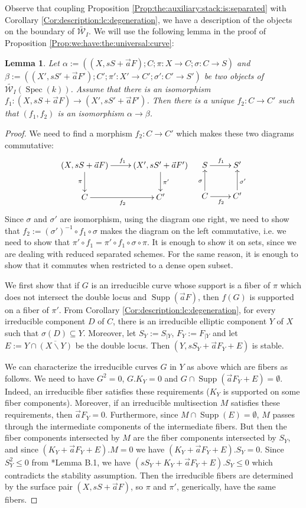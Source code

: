 \documentclass[11pt]{amsart}
\newcommand{\cE}{\mathcal{W}}
\newcommand{\spec}{\operatorname{Spec}}
\newcommand{\supp}{\operatorname{Supp}}
\newtheorem{Lemma}[theorem]{Lemma}
\theoremstyle{definition}
\begin{document}
Observe that coupling Proposition \ref{Prop:the:auxiliary:stack:is:separated} with Corollary \ref{Cor:description:lc:degeneration}, we have a description of the objects on the boundary of $\widetilde{\cE_I}$. We will use the following lemma in the proof of Proposition \ref{Prop:we:have:the:universal:curve}:
\begin{Lemma}\label{Lemma:extend:iso:last:section}
 Let $\alpha:=((X,sS+\vec{a}F); C; \pi:X\to C; \sigma:C \to S)$ and
$\beta:=((X',sS'+\vec{a}F'); C'; \pi':X'\to C'; \sigma':C' \to S')$ be two objects of $\widetilde{\cE_I}(\spec(k))$. Assume
that there is an isomorphism $f_1: (X,sS+\vec{a}F) \to (X',sS'+\vec{a}F')$. Then there is a unique $f_2:C \to C'$ such that
$(f_1,f_2)$ is an isomorphism $\alpha \to \beta$.
\end{Lemma}
\begin{proof}
  We need to find a morphism $f_2:C \to C'$ which makes these two diagrams
commutative:
$$\xymatrix{(X,sS+\vec{a}F) \ar[r]^{f_1} \ar[d]_{\pi} & (X',sS'+\vec{a}F')\ar[d]^{\pi'} \\ C \ar[r]_{f_2} & C'} \text{ } \text{ }
\xymatrix{S \ar[r]^{f_1} & S'\\ C \ar[r]_{f_2} \ar[u]^{\sigma} & C' \ar[u]_{\sigma'}}$$
Since $\sigma$ and $\sigma'$ are isomorphism, using the diagram one right, we need to show that
$f_2:=(\sigma')^{-1} \circ f_1 \circ \sigma$ makes the
diagram on the left commutative, i.e. we need to show that $\pi'\circ f_1=\pi' \circ f_1 \circ \sigma \circ \pi$. It is enough to show it on sets, since we are dealing with reduced separated schemes. For the same reason, it is enough to show that it commutes when restricted to a dense open subset.

We first show that if $G$ is an irreducible curve whose support is a fiber of $\pi$ which does not intersect the double locus and $\supp(\vec{a}F)$, then $f(G)$ is supported on a fiber of $\pi'$.
From Corollary \ref{Cor:description:lc:degeneration},
for every irreducible component $D$ of $C$, there is an irreducible elliptic component $Y$ of $X$ such that $\sigma(D)\subseteq Y$.
Moreover, let $S_Y:=S_{|Y}$, $F_Y:=F_{|Y}$ and let $E:=Y\cap \overline{(X\smallsetminus Y)}$ be the double locus.
Then $(Y,sS_Y+\vec{a}F_Y+E)$ is stable.

We can characterize the irreducible curves $G$ in $Y$ as above which are fibers as follows. We need to have $G^2=0$, $G.K_Y=0$ and $G\cap \supp(\vec{a}F_Y+E) = \emptyset$. Indeed, an irreducible fiber satisfies these requirements ($K_Y$ is supported on some fiber components). Moreover, if an irreducible multisection $M$ satisfies these requirements, then $\vec{a}F_Y=0$. Furthermore, since $M \cap \supp(E)=\emptyset$, $M$ passes through the intermediate components of the intermediate fibers. But then the fiber components intersected by $M$ are the fiber components intersected by $S_Y$, and since $(K_Y+\vec{a}F_Y+E).M=0$ we have $(K_Y+\vec{a}F_Y+E).S_Y=0$. Since $S_Y^2\le 0$ from \cite{AB3}*{Lemma B.1}, we have $(sS_Y+K_Y+\vec{a}F_Y+E).S_Y\le0$ which contradicts the stability assumption.
Then the irreducible fibers are determined by the surface pair $(X,sS+\vec{a}F)$, so $\pi$ and $\pi'$, generically, have the same fibers.


\end{proof}
\end{document}
